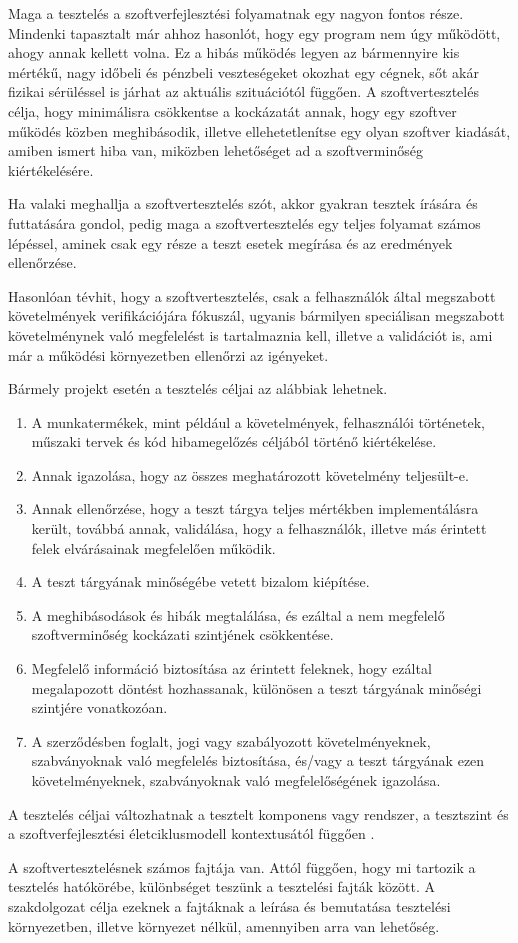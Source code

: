 


Maga a tesztelés a szoftverfejlesztési folyamatnak egy nagyon fontos része. Mindenki tapasztalt már ahhoz hasonlót, hogy egy program nem úgy működött, ahogy annak kellett volna. Ez a hibás működés legyen az bármennyire kis mértékű, nagy időbeli és pénzbeli veszteségeket okozhat egy cégnek, sőt akár fizikai sérüléssel is járhat az aktuális szituációtól függően. A szoftvertesztelés célja, hogy minimálisra csökkentse a kockázatát annak, hogy egy szoftver működés közben meghibásodik, illetve ellehetetlenítse egy olyan szoftver kiadását, amiben ismert hiba van, miközben lehetőséget ad a szoftverminőség kiértékelésére.

Ha valaki meghallja a szoftvertesztelés szót, akkor gyakran tesztek írására és futtatására gondol, pedig maga a szoftvertesztelés egy teljes folyamat számos lépéssel, aminek csak egy része a teszt esetek megírása és az eredmények ellenőrzése.

Hasonlóan tévhit, hogy a szoftvertesztelés, csak a felhasználók által megszabott követelmények verifikációjára fókuszál, ugyanis bármilyen  speciálisan megszabott követelménynek való megfelelést is tartalmaznia kell, illetve a validációt is, ami már a működési környezetben ellenőrzi az igényeket.

Bármely projekt esetén a tesztelés céljai az alábbiak lehetnek.
\begin {enumerate}
 \item A munkatermékek, mint például a követelmények, felhasználói történetek, műszaki tervek és kód hibamegelőzés céljából történő kiértékelése.
\item Annak igazolása, hogy az összes meghatározott követelmény teljesült-e.
\item Annak ellenőrzése, hogy a teszt tárgya teljes mértékben implementálásra került, továbbá annak, validálása, hogy a felhasználók, illetve más érintett felek elvárásainak megfelelően működik.
\item A teszt tárgyának minőségébe vetett bizalom kiépítése.
\item A meghibásodások és hibák megtalálása, és ezáltal a nem megfelelő szoftverminőség kockázati szintjének csökkentése.
\item Megfelelő információ biztosítása az érintett feleknek, hogy ezáltal megalapozott döntést hozhassanak, különösen a teszt tárgyának minőségi szintjére vonatkozóan.
\item A szerződésben foglalt, jogi vagy szabályozott követelményeknek, szabványoknak való megfelelés biztosítása, és/vagy a teszt tárgyának ezen követelményeknek, szabványoknak való megfelelőségének igazolása.
\end {enumerate}
A tesztelés céljai változhatnak a tesztelt komponens vagy rendszer, a tesztszint és a szoftverfejlesztési életciklusmodell kontextusától függően \cite[~11. oldal]{syllabus}.

A szoftvertesztelésnek számos fajtája van. Attól függően, hogy mi tartozik a tesztelés hatókörébe, különbséget teszünk a tesztelési fajták között. A szakdolgozat célja ezeknek a fajtáknak a leírása és bemutatása tesztelési környezetben, illetve környezet nélkül, amennyiben arra van lehetőség.
